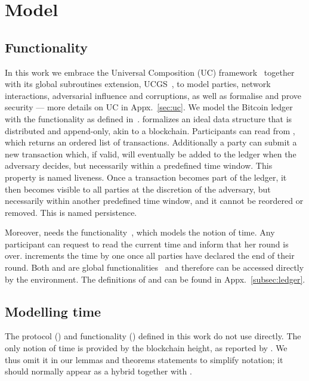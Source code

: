 \section{Model}

  \subsection{\ledger Functionality}
  In this work we embrace the Universal Composition (UC) framework~\cite{uc}
  together with its global subroutines extension,
  UCGS~\cite{DBLP:conf/tcc/BadertscherCHTZ20}, to
  model parties, network interactions, adversarial influence and corruptions, as
  well as formalise and prove security --- more details on UC in
  Appx.~\ref{sec:uc}. We model the Bitcoin ledger with the \ledger
  functionality as defined in~\cite{BMTZ17,genesis}. \ledger formalizes an ideal
  data structure that is
  distributed and append-only, akin to a blockchain. Participants can read from
  \ledger, which returns an ordered list of transactions. Additionally a party
  can submit a new transaction which, if valid, will eventually be added to the
  ledger when the adversary decides, but necessarily within a predefined time
  window. This property is named liveness. Once a transaction becomes part of
  the ledger, it then becomes visible to all parties at the discretion of the
  adversary, but necessarily within another predefined time window, and it
  cannot be reordered or removed. This is named persistence.

  Moreover, \ledger needs the \Fclock
  functionality~\cite{DBLP:conf/tcc/KatzMTZ13}, which models the notion of time.
  Any \Fclock participant can request to read the current time and inform \Fclock that her round is over. \Fclock increments the
  time by one once all parties have declared the end of their round. Both
  \ledger and \Fclock are global
  functionalities~\cite{DBLP:conf/tcc/BadertscherCHTZ20} and therefore can be
  accessed directly by the environment. The definitions of \ledger and \Fclock
  can be found in Appx.~\ref{subsec:ledger}.

  \subsection{Modelling time}
  The protocol (\pchan) and functionality (\fchan) defined in this work do not use \Fclock
  directly. The only notion of time is provided by the
  blockchain height, as reported by \ledger. We thus omit it in
  our lemmas and theorems statements to simplify notation; it should
  normally appear as a hybrid together with \ledger.

